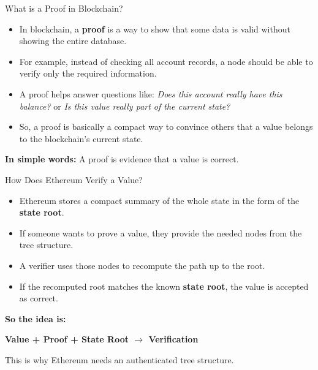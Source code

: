 \documentclass{beamer}
\begin{document}
\begin{frame}{What is a Proof in Blockchain?}
\begin{itemize}
    \item In blockchain, a \textbf{proof} is a way to show that some data is valid without showing the entire database.
    \item For example, instead of checking all account records, a node should be able to verify only the required information.
    \item A proof helps answer questions like: \textit{Does this account really have this balance?} or \textit{Is this value really part of the current state?}
    \item So, a proof is basically a compact way to convince others that a value belongs to the blockchain's current state.
\end{itemize}

\vspace{0.3cm}
\textbf{In simple words:} A proof is evidence that a value is correct.
\end{frame}

\begin{frame}{How Does Ethereum Verify a Value?}
\begin{itemize}
    \item Ethereum stores a compact summary of the whole state in the form of the \textbf{state root}.
    \item If someone wants to prove a value, they provide the needed nodes from the tree structure.
    \item A verifier uses those nodes to recompute the path up to the root.
    \item If the recomputed root matches the known \textbf{state root}, the value is accepted as correct.
\end{itemize}

\vspace{0.3cm}
\textbf{So the idea is:}
\begin{center}
\textbf{Value + Proof + State Root $\rightarrow$ Verification}
\end{center}

\vspace{0.2cm}
This is why Ethereum needs an authenticated tree structure.
\end{frame}
\end{document}
